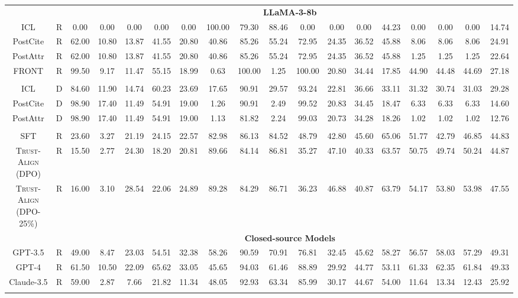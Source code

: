 \documentclass{article} %
\newcommand{\method}[0]{\textsc{Trust-Align}}
\begin{document}
\begin{table}[htb!]
{\begin{tabular}{ccc*{15}c}
& & \multicolumn{16}{c}{\cellcolor[gray]{0.9}\textbf{LLaMA-3-8b}} \\
ICL & R & 0.00 & 0.00 & 0.00 & 0.00 & 0.00 & 100.00 & 79.30 & 88.46 & 0.00 & 0.00 & 0.00 & 44.23 & 0.00 & 0.00 & 0.00 & 14.74 \\
PostCite & R & 62.00 & 10.80 & 13.87 & 41.55 & 20.80 & 40.86 & 85.26 & 55.24 & 72.95 & 24.35 & 36.52 & 45.88 & 8.06 & 8.06 & 8.06 & 24.91 \\
PostAttr & R & 62.00 & 10.80 & 13.87 & 41.55 & 20.80 & 40.86 & 85.26 & 55.24 & 72.95 & 24.35 & 36.52 & 45.88 & 1.25 & 1.25 & 1.25 & 22.64 \\
FRONT & R & 99.50 & 9.17 & 11.47 & 55.15 & 18.99 & 0.63 & 100.00 & 1.25 & 100.00 & 20.80 & 34.44 & 17.85 & 44.90 & 44.48 & 44.69 & 27.18 \\\\

ICL & D & 84.60 & 11.90 & 14.74 & 60.23 & 23.69 & 17.65 & 90.91 & 29.57 & 93.24 & 22.81 & 36.66 & 33.11 & 31.32 & 30.74 & 31.03 & 29.28 \\
PostCite & D & 98.90 & 17.40 & 11.49 & 54.91 & 19.00 & 1.26 & 90.91 & 2.49 & 99.52 & 20.83 & 34.45 & 18.47 & 6.33 & 6.33 & 6.33 & 14.60 \\
PostAttr & D & 98.90 & 17.40 & 11.49 & 54.91 & 19.00 & 1.13 & 81.82 & 2.24 & 99.03 & 20.73 & 34.28 & 18.26 & 1.02 & 1.02 & 1.02 & 12.76 \\\\

SFT & R & 23.60 & 3.27 & 21.19 & 24.15 & 22.57 & 82.98 & 86.13 & 84.52 & 48.79 & 42.80 & 45.60 & 65.06 & 51.77 & 42.79 & 46.85 & 44.83 \\

\method{} (DPO) & R & 15.50 & 2.77 & 24.30 & 18.20 & 20.81 & 89.66 & 84.14 & 86.81 & 35.27 & 47.10 & 40.33 & 63.57 & 50.75 & 49.74 & 50.24 & 44.87 \\
\method{} (DPO-25\%) & R & 16.00 & 3.10 & 28.54 & 22.06 & 24.89 & 89.28 & 84.29 & 86.71 & 36.23 & 46.88 & 40.87 & 63.79 & 54.17 & 53.80 & 53.98 & 47.55 \\ 

& & \multicolumn{16}{c}{\cellcolor[gray]{0.9}\textbf{Closed-source Models}} \\
GPT-3.5 & R & 49.00 & 8.47 & 23.03 & 54.51 & 32.38 & 58.26 & 90.59 & 70.91 & 76.81 & 32.45 & 45.62 & 58.27 & 56.57 & 58.03 & 57.29 & 49.31 \\

GPT-4 & R & 61.50 & 10.50 & 22.09 & 65.62 & 33.05 & 45.65 & 94.03 & 61.46 & 88.89 & 29.92 & 44.77 & 53.11 & 61.33 & 62.35 & 61.84 & 49.33 \\
Claude-3.5 & R & 59.00 & 2.87 & 7.66 & 21.82 & 11.34 & 48.05 & 92.93 & 63.34 & 85.99 & 30.17 & 44.67 & 54.00 & 11.64 & 13.34 & 12.43 & 25.92 \\\\


\end{tabular}}
\end{table}
\end{document}
